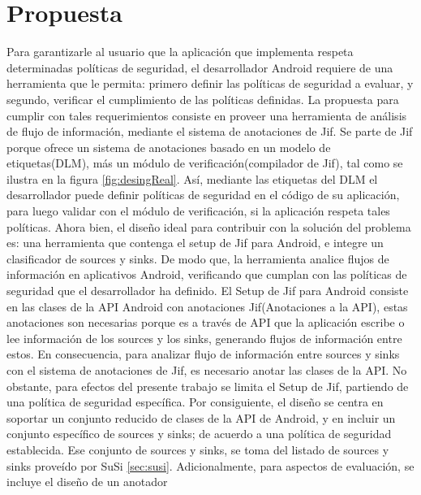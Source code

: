 \section{Propuesta}
Para garantizarle al usuario que la aplicación que implementa respeta
determinadas políticas de seguridad, el desarrollador Android requiere de una
herramienta que le permita: primero definir las políticas de seguridad a
evaluar, y segundo, verificar el cumplimiento de las políticas
definidas.\newline 
La propuesta para cumplir con tales requerimientos consiste en proveer una
herramienta de análisis de flujo de información, mediante el sistema de
anotaciones de Jif. Se parte de Jif porque ofrece un sistema de anotaciones
basado en un modelo de etiquetas(DLM), más un módulo de verificación(compilador
de Jif), tal como se ilustra en la figura \ref{fig:desingReal}. 
Así, mediante las etiquetas del DLM el desarrollador puede definir políticas de
seguridad en el código de su aplicación, para luego validar con el módulo de
verificación, si la aplicación respeta tales políticas.\newline 
Ahora bien, el diseño ideal para contribuir con la solución del problema es: una
herramienta que contenga el setup de Jif para Android, e integre un clasificador de sources
y sinks. De modo que, la herramienta analice flujos de información en
aplicativos Android, verificando que cumplan con las políticas de seguridad que
el desarrollador ha definido.\newline 
El Setup de Jif para Android consiste en las clases de la API Android con
anotaciones Jif(Anotaciones a la API), estas
anotaciones son necesarias porque es a través de API que la aplicación escribe o
lee información de los sources y los sinks, generando flujos de información
entre estos. En consecuencia, para analizar flujo de información entre sources y
sinks con el sistema de anotaciones de Jif, es necesario anotar las clases
de la API.\newline 
No obstante, para efectos del presente trabajo se limita el Setup de Jif,
partiendo de una política de seguridad específica.
Por consiguiente, el diseño se centra en soportar un conjunto reducido de clases
de la API de Android, y en incluir un conjunto específico de sources y
sinks; de acuerdo a una política de seguridad establecida. Ese conjunto de
sources y sinks, se toma del listado de sources y sinks proveído por SuSi
\ref{sec:susi}.\newline
Adicionalmente, para aspectos de evaluación, se incluye el diseño de un anotador
